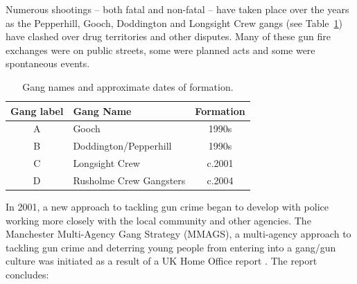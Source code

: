 \documentclass[twocolumn]{svjour3}          %
\theoremstyle{definition}
\begin{document}
Numerous shootings -- both fatal and non-fatal -- have taken place
over the years as the Pepperhill, Gooch, Doddington and Longsight
Crew gangs (see Table~\ref{table:gangnames}) have clashed over drug
territories and other disputes. Many of these gun fire exchanges were
on public streets, some were planned acts and some were spontaneous
events.

\begin{table}[!ht]
\centering
\begin{tabularx}{\columnwidth}{c X c}
\hline
Gang label & Gang Name & Formation  \\ %
\hline
A & Gooch & 1990s\\
B & Doddington/Pepperhill & 1990s\\
C & Longsight Crew &  c.2001\\
D & Rusholme Crew Gangsters & c.2004\\ %
\hline
\end{tabularx}
\caption{Gang names and approximate dates of formation.}
\label{table:gangnames}
\end{table}

In 2001, a new approach to tackling gun crime began to develop with
police working more closely with the local community and other
agencies. The Manchester Multi-Agency Gang Strategy (MMAGS), a
multi-agency approach to tackling gun crime and deterring young people
from entering into a gang/gun culture was initiated as a result of a
UK Home Office report \citep{BullockTilley2002}. The report concludes:
\end{document}
